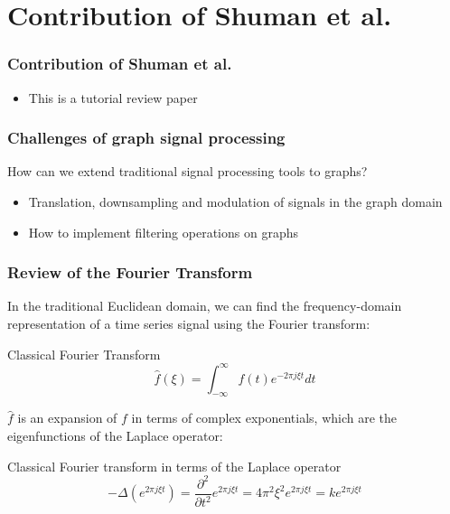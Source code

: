 \documentclass{beamer}
\begin{document}
\section{Contribution of Shuman et al.}

\begin{frame}
  \frametitle{Contribution of Shuman et al.}
  \begin{itemize}
  \item This is a tutorial review paper
  \end{itemize}
\end{frame}

\begin{frame}
  \frametitle{Challenges of graph signal processing}
  How can we extend traditional signal processing tools to graphs?
  \begin{itemize}
    \item Translation, downsampling and modulation of signals in the graph
      domain
    \item How to implement filtering operations on graphs
  \end{itemize}
\end{frame}


\begin{frame}
\frametitle{Review of the Fourier Transform}

In the traditional Euclidean domain, we can find the frequency-domain
representation of a time series signal using the Fourier transform:

\begin{block}{Classical Fourier Transform}
  \begin{equation}
    \hat{f}(\xi) = \int_{-\infty}^{\infty} f(t) e^{-2 \pi j \xi t} dt 
  \end{equation}
\end{block}

$\hat{f}$ is an expansion of $f$ in terms of complex exponentials, which are the
eigenfunctions of the Laplace operator:

\begin{block}{Classical Fourier transform in terms of the Laplace operator}
  \begin{equation}
    - \Delta (e^{2 \pi j \xi t}) = \frac{\partial^2}{\partial t^2} e^{2 \pi j \xi t} = 4 \pi^2 \xi^2 e^{2 \pi j \xi t} = k e^{2 \pi j \xi t}
  \end{equation}
\end{block}
\end{frame}
\end{document}
